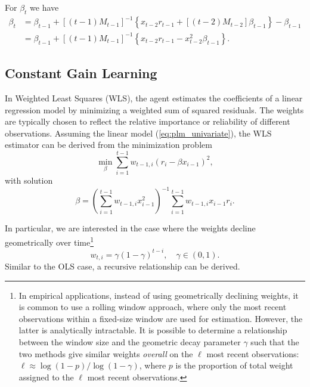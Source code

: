 \documentclass[11pt]{article}
\begin{document}
For $\beta_t$ we have
\begin{equation}\label{eq:b_t_evolution}
    \begin{aligned}
        \beta_t & = \beta_{t-1} + \left[(t-1) M_{t-1} \right]^{-1} \left\{ x_{t-2} r_{t-1} + \left[(t-2) M_{t-2} \right] \beta_{t-1} \right\} - \beta_{t-1} \\
        & = \beta_{t-1} + \left[(t-1) M_{t-1} \right]^{-1} \left\{ x_{t-2} r_{t-1} - x_{t-2}^2 \beta_{t-1} \right\}.
    \end{aligned}
\end{equation}

\subsection{Constant Gain Learning}\label{app:WLS}
In Weighted Least Squares (WLS), the agent estimates the coefficients of a linear regression model by minimizing a weighted sum of squared residuals.
The weights are typically chosen to reflect the relative importance or reliability of different observations. Assuming the linear model (\ref{eq:plm_univariate}),
the WLS estimator can be derived from the minimization problem
\begin{equation}
    \min_{\beta} \sum^{t-1}_{i=1} {w_{t-1,i}} (r_i - \beta x_{i-1}) ^2,
\end{equation}
with solution
\begin{equation}
    {\beta} = \left(\sum^{t-1}_{i=1} {w_{t-1,i}} x_{i-1}^2 \right)^{-1} \sum^{t-1}_{i=1} {w_{t-1,i}} x_{i-1} r_i.
\end{equation}

In particular, we are interested in the case where the weights decline geometrically over time\footnote{
    In empirical applications, instead of using geometrically declining weights, it is common to use a rolling window approach, where only the most recent observations within a fixed-size window are used for estimation. 
    However, the latter is analytically intractable.
    It is possible to determine a relationship between the window size and the geometric decay parameter $\gamma$ such that the two methods give similar weights \emph{overall} on the $\ell$ most recent observations:
    $\ell \approx \log(1 - p) / \log(1 - \gamma)$, where $p$ is the proportion of total weight assigned to the $\ell$ most recent observations.
}
\begin{equation}
    w_{t,i} = \gamma (1 - \gamma)^{t-i}, \quad \gamma \in (0,1).
\end{equation}
Similar to the OLS case, a recursive relationship can be derived.
\end{document}

